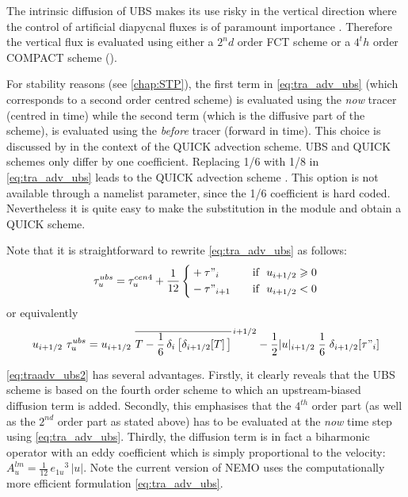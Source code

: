 \documentclass[../tex_main/NEMO_manual]{subfiles}
\begin{document}
The intrinsic diffusion of UBS makes its use risky in the vertical direction where
the control of artificial diapycnal fluxes is of paramount importance
\citep{Shchepetkin_McWilliams_OM05, Demange_PhD2014}.
Therefore the vertical flux is evaluated using either a $2^nd$ order FCT scheme or a $4^th$ order COMPACT scheme
().

For stability reasons (see \autoref{chap:STP}), the first term  in \autoref{eq:tra_adv_ubs}
(which corresponds to a second order centred scheme)
is evaluated using the \textit{now} tracer (centred in time) while the second term
(which is the diffusive part of the scheme),
is evaluated using the \textit{before} tracer (forward in time).
This choice is discussed by \citet{Webb_al_JAOT98} in the context of the QUICK advection scheme.
UBS and QUICK schemes only differ by one coefficient.
Replacing 1/6 with 1/8 in \autoref{eq:tra_adv_ubs} leads to the QUICK advection scheme \citep{Webb_al_JAOT98}.
This option is not available through a namelist parameter, since the 1/6 coefficient is hard coded.
Nevertheless it is quite easy to make the substitution in the  module and obtain a QUICK scheme.

Note that it is straightforward to rewrite \autoref{eq:tra_adv_ubs} as follows:
\begin{equation} \label{eq:traadv_ubs2}
\tau_u^{ubs} = \tau_u^{cen4} + \frac{1}{12} \left\{	 
   \begin{aligned}
	& + \tau"_i			& \quad \text{if }\ u_{i+1/2} \geqslant 0 \\
	&  - \tau"_{i+1}		& \quad \text{if }\ u_{i+1/2}       <       0
   \end{aligned}    \right.
\end{equation}
or equivalently 
\begin{equation} \label{eq:traadv_ubs2b}
u_{i+1/2} \ \tau_u^{ubs} 
=u_{i+1/2} \ \overline{ T - \frac{1}{6}\,\delta_i\left[ \delta_{i+1/2}[T] \,\right] }^{\,i+1/2}
- \frac{1}{2} |u|_{i+1/2} \;\frac{1}{6} \;\delta_{i+1/2}[\tau"_i]
\end{equation}

\autoref{eq:traadv_ubs2} has several advantages.
Firstly, it clearly reveals that the UBS scheme is based on the fourth order scheme to which
an upstream-biased diffusion term is added.
Secondly, this emphasises that the $4^{th}$ order part (as well as the $2^{nd}$ order part as stated above) has to
be evaluated at the \emph{now} time step using \autoref{eq:tra_adv_ubs}.
Thirdly, the diffusion term is in fact a biharmonic operator with an eddy coefficient which
is simply proportional to the velocity:
$A_u^{lm}= \frac{1}{12}\,{e_{1u}}^3\,|u|$.
Note the current version of NEMO uses the computationally more efficient formulation \autoref{eq:tra_adv_ubs}.
\end{document}
